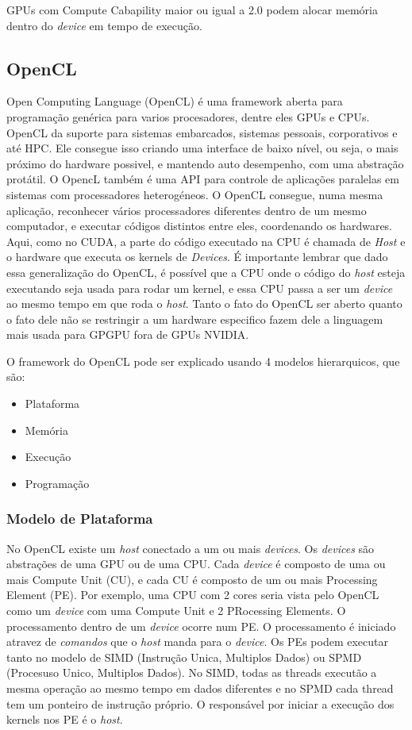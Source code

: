 GPUs com Compute Cabapility maior ou igual a 2.0 podem alocar memória dentro do \textit{device} em tempo de execução.

\subsection{OpenCL}
Open Computing Language (OpenCL) é uma framework aberta para programação genérica para varios procesadores, dentre eles GPUs e CPUs.
OpenCL da suporte para sistemas embarcados, sistemas pessoais, corporativos e até HPC. Ele consegue isso criando uma interface
de baixo nível, ou seja, o mais próximo do hardware possivel, e mantendo auto desempenho, com uma abstração protátil. O OpencL
também é uma API para controle de aplicações paralelas em sistemas com processadores heterogéneos. O OpenCL consegue, numa mesma
aplicação, reconhecer vários processadores diferentes dentro de um mesmo computador, e executar códigos distintos entre eles,
coordenando os hardwares. Aqui, como no CUDA, a parte do código executado na CPU é chamada de \textit{Host} e o hardware
que executa os kernels de \textit{Devices}. É importante lembrar que dado essa generalização do OpenCL, é possível que a CPU
onde o código do \textit{host} esteja executando seja usada para rodar um kernel, e essa CPU passa a ser um \textit{device}
ao mesmo tempo em que roda o \textit{host}. Tanto o fato do OpenCL ser aberto quanto o fato dele não se restringir a um
hardware especifico fazem dele a linguagem mais usada para GPGPU fora de GPUs NVIDIA.

O framework do OpenCL pode ser explicado usando 4 modelos hierarquicos, que são:
\begin{itemize}
  \item Plataforma
  \item Memória
  \item Execução
  \item Programação
\end{itemize}

\subsubsection{Modelo de Plataforma}
No OpenCL existe um \textit{host} conectado a um ou mais \textit{devices}. Os \textit{devices} são abstrações de uma GPU ou de uma CPU.
Cada \textit{device} é composto de uma ou mais Compute Unit (CU), e cada CU é composto de um ou mais Processing Element (PE). 
Por exemplo, uma CPU com 2 cores seria vista pelo OpenCL como um \textit{device} com uma Compute Unit e 2 PRocessing Elements. 
O processamento dentro de um \textit{device} ocorre num PE. O processamento é iniciado atravez de \textit{comandos} que o \textit{host} 
manda para o \textit{device}. Os PEs podem executar tanto no modelo de SIMD (Instrução Unica, Multiplos Dados) ou SPMD 
(Procesuso Unico, Multiplos Dados). No SIMD, todas as threads executão a mesma operação ao mesmo tempo em dados diferentes
e no SPMD cada thread tem um ponteiro de instrução próprio. O responsável por iniciar a execução dos kernels nos PE é o \textit{host}.

